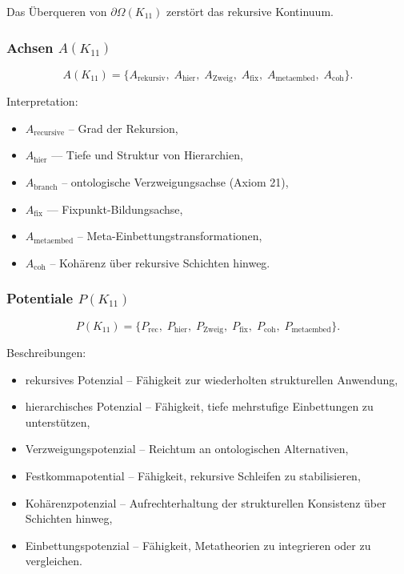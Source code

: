 Das Überqueren von $\partial\Omega(K_{11})$ zerstört das rekursive Kontinuum.

\subsubsection{Achsen $A(K_{11})$}

\[
A(K_{11}) =
\{
A_{\mathrm{rekursiv}},\;
A_{\mathrm{hier}},\;
A_{\mathrm{Zweig}},\;
A_{\mathrm{fix}},\;
A_{\mathrm{metaembed}},\;
A_{\mathrm{coh}}
\}.
\]

Interpretation:
\begin{itemize}
    \item $A_{\mathrm{recursive}}$ – Grad der Rekursion,
    \item $A_{\mathrm{hier}}$ — Tiefe und Struktur von Hierarchien,
    \item $A_{\mathrm{branch}}$ – ontologische Verzweigungsachse (Axiom 21),
    \item $A_{\mathrm{fix}}$ — Fixpunkt-Bildungsachse,
    \item $A_{\mathrm{metaembed}}$ – Meta-Einbettungstransformationen,
    \item $A_{\mathrm{coh}}$ – Kohärenz über rekursive Schichten hinweg.
\end{itemize}

\subsubsection{Potentiale $P(K_{11})$}

\[
P(K_{11})=
\{
P_{\mathrm{rec}},\;
P_{\mathrm{hier}},\;
P_{\mathrm{Zweig}},\;
P_{\mathrm{fix}},\;
P_{\mathrm{coh}},\;
P_{\mathrm{metaembed}}
\}.
\]

Beschreibungen:
\begin{itemize}
    \item rekursives Potenzial – Fähigkeit zur wiederholten strukturellen Anwendung,
    \item hierarchisches Potenzial – Fähigkeit, tiefe mehrstufige Einbettungen zu unterstützen,
    \item Verzweigungspotenzial – Reichtum an ontologischen Alternativen,
    \item Festkommapotential – Fähigkeit, rekursive Schleifen zu stabilisieren,
    \item Kohärenzpotenzial – Aufrechterhaltung der strukturellen Konsistenz über Schichten hinweg,
    \item Einbettungspotenzial – Fähigkeit, Metatheorien zu integrieren oder zu vergleichen.
\end{itemize}

